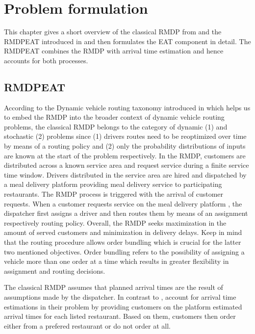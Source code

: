 \chapter{Problem formulation}

This chapter gives a short overview of the classical RMDP from \cite{UlmerRMDP} and the RMDPEAT introduced in \cite{Hildebrandt2020_EAT} and then formulates the EAT component in detail. The RMDPEAT combines the RMDP with arrival time estimation and hence accounts for both processes.

\section{RMDPEAT} 

According to the Dynamic vehicle routing taxonomy introduced in \cite{psaraftis} which helps us to embed the RMDP into the broader context of dynamic vehicle routing problems, the classical RMDP belongs to the category of dynamic (1) and stochastic (2) problems since (1) drivers routes need to be reoptimized over time by means of a routing policy and (2) only the probability distributions of inputs are known at the start of the problem respectively. In the RMDP, customers are distributed across a known service area and request service during a finite service time window. Drivers distributed in the service area are hired and dispatched by a meal delivery platform providing meal delivery service to participating restaurants. The RMDP process is triggered with the arrival of customer requests. When a customer requests service on the meal delivery platform , the dispatcher first assigns a driver and then routes them by means of an assignment respectively routing policy. Overall, the RMDP seeks maximization in the amount of served customers and minimization in delivery delays. Keep in mind that the routing procedure allows order bundling which is crucial for the latter two mentioned objectives. Order bundling refers to the possibility of assigning a vehicle more than one order at a time which results in greater flexibility in assignment and routing decisions.

The classical RMDP assumes that planned arrival times are the result of assumptions made by the dispatcher. In contrast to \citet{UlmerRMDP}, \citet{Hildebrandt2020_EAT} account for arrival time estimations in their problem by providing customers on the platform estimated arrival times for each listed restaurant. Based on them, customers then order either from a prefered restaurant or do not order at all. 



